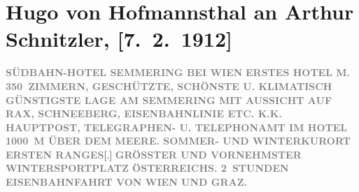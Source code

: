 

         \renewcommand{\erwaehnteInstitutionen}{Institutionen: Südbahnstrecke}
         \renewcommand{\erwaehnteOrte}{Orte: Elisabethstraße, Graz, Rax, Schneeberg, Semmering, Südbahnhotel, Volkstheater, Wien, Österreich}
         \renewcommand{\erwaehnteWerke}{Werke: Marionetten. Drei Einakter}
               \section[Hugo von Hofmannsthal an Arthur Schnitzler, {[}7. 2. 1912{]}]{ Hugo von Hofmannsthal an Arthur Schnitzler, {[}7. 2. 1912{]}}\nopagebreak{}\rehead{ }\begin{ledgroupsized}[t]{13cm}\normalsize\beginnumbering \toendnotes[C]{\smallbreak\pagebreak[2]} 
\toendnotes[C]{\smallbreak}\pstart
           \noindent{}\centering{}{\pb}\textcolor{gray}{\textbf{SÜDBAHN-HOTEL SEMMERING BEI WIEN}}\pend
           \pstart
           \noindent{}\textcolor{gray}{\textbf{ERSTES HOTEL M. 350 ZIMMERN, GESCHÜTZTE, SCHÖNSTE U.
                        KLIMATISCH GÜNSTIGSTE LAGE AM SEMMERING MIT
                        AUSSICHT AUF RAX, SCHNEEBERG, EISENBAHNLINIE ETC. K.K. HAUPTPOST, TELEGRAPHEN-
                        U. TELEPHONAMT IM HOTEL}}\pend
           \pstart
           \textcolor{gray}{\textbf{1000 M ÜBER DEM MEERE. SOMMER- UND WINTERKURORT ERSTEN
                        RANGES}}{[}.{]}{ }\textcolor{gray}{\textbf{GRÖSSTER UND VORNEHMSTER WINTERSPORTPLATZ ÖSTERREICHS. 2 STUNDEN EISENBAHNFAHRT VON WIEN UND GRAZ.}}\pend

\end{ledgroupsized}
